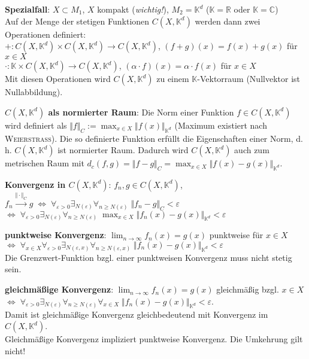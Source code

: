 \textbf{Spezialfall}: $X \subset M_1$, $X$ kompakt (\emph{wichtig!}),
$M_2 = \mathbb{K}^d$
($\mathbb{K} = \mathbb{R}$ oder $\mathbb{K} = \mathbb{C}$) \\
Auf der Menge der stetigen Funktionen $C(X, \mathbb{K}^d)$ werden dann zwei
Operationen definiert: \\
$\boldsymbol{+}: C(X, \mathbb{K}^d) \times C(X, \mathbb{K}^d) \rightarrow
C(X, \mathbb{K}^d)$, $(f + g)(x) = f(x) + g(x)$ für $x \in X$ \\
$\boldsymbol{\cdot}: \mathbb{K} \times C(X, \mathbb{K}^d) \rightarrow
C(X, \mathbb{K}^d)$, $(\alpha \cdot f)(x) = \alpha \cdot f(x)$ für $x \in X$ \\
Mit diesen Operationen wird $C(X, \mathbb{K}^d)$ zu einem
$\mathbb{K}$-Vektorraum (Nullvektor ist Nullabbildung).

\textbf{$C(X, \mathbb{K}^d)$ als normierter Raum}:
Die Norm einer Funktion $f \in C(X, \mathbb{K}^d)$ wird definiert als
$\Vert f \Vert_C := \max_{x \in X} \Vert f(x) \Vert_{\mathbb{K}^d}$
(Maximum existiert nach \textsc{Weierstraß}).
Die so definierte Funktion erfüllt die Eigenschaften einer Norm,
d.\,h. $C(X, \mathbb{K}^d)$ ist normierter Raum.
Dadurch wird $C(X, \mathbb{K}^d)$ auch zum metrischen Raum mit
$d_c(f,g) = \Vert f - g \Vert_C =
\max_{x \in X} \Vert f(x) - g(x) \Vert_{\mathbb{K}^d}$.

\linie

\textbf{Konvergenz in $C(X, \mathbb{K}^d)$}:
$f_n, g \in C(X, \mathbb{K}^d)$, \quad
$f_n \xrightarrow{\Vert \cdot \Vert_C} g \;\Leftrightarrow\;
\forall_{\varepsilon > 0} \exists_{N(\varepsilon)}
\forall_{n \ge N(\varepsilon)}\; \Vert f_n - g \Vert_C < \varepsilon$ \\
$\Leftrightarrow\; \forall_{\varepsilon > 0} \exists_{N(\varepsilon)}
\forall_{n \ge N(\varepsilon)}\;
\max_{x \in X} \Vert f_n(x) - g(x) \Vert_{\mathbb{K}^d} < \varepsilon$

\textbf{punktweise Konvergenz}:
$\lim_{n \to \infty} f_n(x) = g(x)$ punktweise für $x \in X$ \\
$\Leftrightarrow\; \forall_{x \in X} \forall_{\varepsilon > 0}
\exists_{N(\varepsilon, x)} \forall_{n \ge N(\varepsilon, x)}\;
\Vert f_n(x) - g(x) \Vert_{\mathbb{K}^d} < \varepsilon$ \\
Die Grenzwert-Funktion bzgl. einer punktweisen Konvergenz muss nicht stetig
sein.

\textbf{gleichmäßige Konvergenz}:
$\lim_{n \to \infty} f_n(x) = g(x)$ gleichmäßig bzgl. $x \in X$ \\
$\Leftrightarrow\; \forall_{\varepsilon > 0} \exists_{N(\varepsilon)}
\forall_{n \ge N(\varepsilon)} \forall_{x \in X}\;
\Vert f_n(x) - g(x) \Vert_{\mathbb{K}^d} < \varepsilon$. \\
Damit ist gleichmäßige Konvergenz gleichbedeutend mit Konvergenz im
$C(X, \mathbb{K}^d)$. \\
Gleichmäßige Konvergenz impliziert punktweise Konvergenz.
Die Umkehrung gilt nicht!

